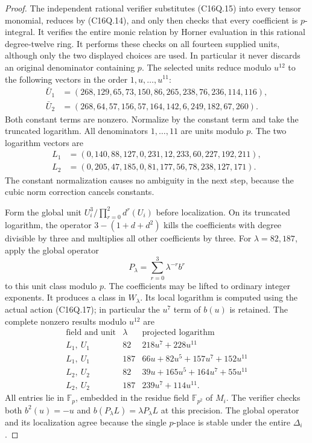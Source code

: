 \begin{proof}
The independent rational verifier substitutes (C16Q.15) into
every tensor monomial, reduces by (C16Q.14), and only then
checks that every coefficient is $p$-integral.
It verifies the entire monic relation by Horner evaluation in
this rational degree-twelve ring.
It performs these checks on all fourteen supplied units, although
only the two displayed choices are used.
In particular it never discards an original denominator containing $p$.
The selected units reduce modulo $u^{12}$ to the following vectors
in the order $1,u,\ldots,u^{11}$:
\[
 \begin{aligned}
 \bar U_1&=(268,129,65,73,150,86,265,238,76,236,114,116),\\
 \bar U_2&=(268,64,57,156,57,164,142,6,249,182,67,260).
 \end{aligned}
 \tag{C16Q.24}
\]
Both constant terms are nonzero.
Normalize by the constant term and take the truncated logarithm.
All denominators $1,\ldots,11$ are units modulo $p$.
The two logarithm vectors are
\[
 \begin{aligned}
 L_1&=(0,140,88,127,0,231,12,233,60,227,192,211),\\
 L_2&=(0,205,47,185,0,81,177,56,78,238,127,171).
 \end{aligned}
 \tag{C16Q.25}
\]
The constant normalization causes no ambiguity in the next step,
because the cubic norm correction cancels constants.

Form the global unit
$U_i^3/\prod_{r=0}^2d^r(U_i)$ before localization.
On its truncated logarithm, the operator
$3-(1+d+d^2)$ kills the coefficients with degree divisible by three
and multiplies all other coefficients by three.
For $\lambda=82,187$, apply the global operator
\[
                         P_\lambda=\sum_{r=0}^3\lambda^{-r}b^r
 \tag{C16Q.26}
\]
to this unit class modulo $p$.
The coefficients may be lifted to ordinary integer exponents.
It produces a class in $W_\lambda$.
Its local logarithm is computed using the actual action (C16Q.17);
in particular the $u^7$ term of $b(u)$ is retained.
The complete nonzero results modulo $u^{12}$ are
\[
 \begin{array}{c|c|l}
 \text{field and unit}&\lambda&\text{projected logarithm}\\ \hline
 L_1,\ U_1&82&218u^7+228u^{11}\\
 L_1,\ U_1&187&66u+82u^5+157u^7+152u^{11}\\
 L_2,\ U_2&82&39u+165u^5+164u^7+55u^{11}\\
 L_2,\ U_2&187&239u^7+114u^{11}.
 \end{array}
 \tag{C16Q.27}
\]
All entries lie in $\mathbb F_p$, embedded in the residue
field $\mathbb F_{p^2}$ of $M_i$.
The verifier checks both $b^2(u)=-u$ and
$b(P_\lambda L)=\lambda P_\lambda L$ at this precision.
The global operator and its localization agree because the
single $p$-place is stable under the entire $\Delta_i$.


\end{proof}
